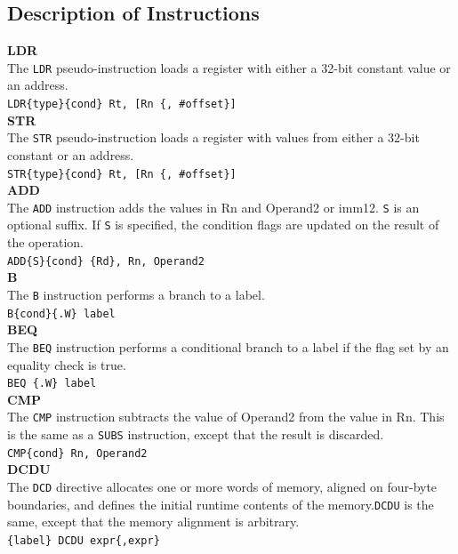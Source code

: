 \documentclass[footheight=20pt, footsepline, headheight=20pt, headsepline]{scrartcl}
\begin{document}
\subsection*{Description of Instructions}
\textbf{LDR}\\
The \verb|LDR| pseudo-instruction loads a register with either a 32-bit constant value or an address.\\
\verb|LDR{type}{cond} Rt, [Rn {, #offset}]| \\
\textbf{STR}\\
The \verb|STR| pseudo-instruction loads a register with values from either a 32-bit constant or an address.\\
\verb|STR{type}{cond} Rt, [Rn {, #offset}]|\\  
\textbf{ADD}\\
The \verb|ADD| instruction adds the values in Rn and Operand2 or imm12. \verb|S| is an optional suffix. If \verb|S| is specified, the condition flags are updated on the result of the operation.\\
\verb|ADD{S}{cond} {Rd}, Rn, Operand2|\\
\textbf{B}\\
The \verb|B| instruction performs a branch to a label.\\
\verb|B{cond}{.W} label|\\
\textbf{BEQ}\\
The \verb|BEQ| instruction performs a conditional branch to a label if the flag set by an equality check is true.\\
\verb|BEQ {.W} label|\\
\textbf{CMP}\\
The \verb|CMP| instruction subtracts the value of Operand2 from the value in Rn. This is the same as a \verb|SUBS| instruction, except that the result is discarded.\\
\verb|CMP{cond} Rn, Operand2|\\
\textbf{DCDU}\\
The \verb|DCD| directive allocates one or more words of memory, aligned on four-byte boundaries, and defines the initial runtime contents of the memory.\verb|DCDU| is the same, except that the memory alignment is arbitrary.\\
\verb|{label} DCDU expr{,expr}|\\


\FloatBarrier
\end{document}
